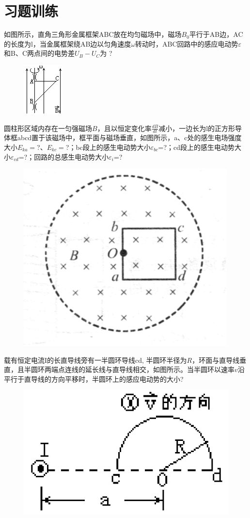 \documentclass[lang=cn,10pt]{elegantbook}
\begin{document}
	 \section{习题训练}
	 \begin{exercise}
	 	如图所示，直角三角形金属框架ABC放在均匀磁场中，磁场$B_{0}$平行于AB边，AC的长度为l，当金属框架绕AB边以匀角速度$\omega$转动时，ABC回路中的感应电动势$\varepsilon$和B、C两点间的电势差$U_{B}-U_{C}$为 ?
	 	
\begin{figure}[H]
	\centering
	\includegraphics[width=0.18\linewidth]{image/图片21}
	\caption{}
	\label{fig:21}
\end{figure}
	 	
	 \end{exercise}
	 \begin{exercise}
	 	圆柱形区域内存在一匀强磁场$B$，且以恒定变化率$\frac{dB}{dt}$减小，一边长为l的正方形导体框abcd置于该磁场中，框平面与磁场垂直，如图所示，a、c处的感生电场强度大小$E_{ka}=$?、$E_{kc}=$?；bc段上的感生电动势大小$\varepsilon_{bc}$=?；cd段上的感生电动势大小$\varepsilon_{cd}$=?；回路的总感生电动势大小$\varepsilon_{i}$=?
	 	
\begin{figure}[H]
	\centering
	\includegraphics[width=0.18\linewidth]{image/图片22}
	\caption{}
	\label{fig:22}
\end{figure}
	 	
	 \end{exercise}
	 \begin{exercise}
	 	载有恒定电流I的长直导线旁有一半圆环导线cd, 半圆环半径为$R$，环面与直导线垂直，且半圆环两端点连线的延长线与直导线相交，如图所示。当半圆环以速率$v$沿平行于直导线的方向平移时，半圆环上的感应电动势的大小?
	 	
\begin{figure}[H]
	\centering
	\includegraphics[width=0.18\linewidth]{image/图片23}
	\caption{}
	\label{fig:23}
\end{figure}
	 \end{exercise}
\end{document}
